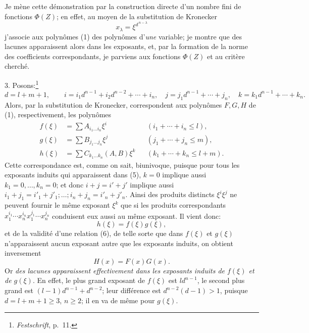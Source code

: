 \documentclass[11pt]{article}
\begin{document}
Je mène cette démonstration par la construction directe d'un nombre fini de fonctions $\Phi(Z)$; en effet, au moyen de la substitution de Kronecker
\[
 x_\lambda=\xi^{d^{\,n-\lambda}}
\]
j'associe aux polynômes (1) des polynômes d'\emph{une} variable; je montre que des lacunes apparaissent alors dans les exposants, et, par la formation de la norme des coefficients correspondants, je parviens aux fonctions $\Phi(Z)$ et au critère cherché.

3. Posons:\footnote{\emph{Festschrift}, p.~11.}
\begin{equation}
 d=l+m+1,\qquad
 i=i_1d^{n-1}+i_2d^{n-2}+\cdots+i_n,
\quad
 j=j_1d^{n-1}+\cdots+j_n,
\quad
 k=k_1d^{n-1}+\cdots+k_n.
\tag{4}
\end{equation}
Alors, par la substitution de Kronecker, correspondent aux polynômes $F,G,H$ de (1), respectivement, les polynômes
\begin{equation}
\begin{aligned}
 f(\xi)&=\sum A_{i_1\ldots i_n}\xi^i &&(i_1+\cdots+i_n\le l),\\
 g(\xi)&=\sum B_{j_1\ldots j_n}\xi^j &&(j_1+\cdots+j_n\le m),\\
 h(\xi)&=\sum C_{k_1\ldots k_n}(A,B)\xi^k &&(k_1+\cdots+k_n\le l+m).
\end{aligned}
\tag{5}
\end{equation}
Cette correspondance est, comme on sait, biunivoque, puisque pour tous les exposants induits qui apparaissent dans (5), $k=0$ implique aussi $k_1=0,\ldots,k_n=0$; et donc $i+j=i'+j'$ implique aussi $i_1+j_1=i'_1+j'_1;\ldots;i_n+j_n=i'_n+j'_n$. Ainsi des produits distincts $\xi^i\xi^j$ ne peuvent fournir le même exposant $\xi^k$ que si les produits correspondants $x_1^{i_1}\cdots x_n^{i_n}x_1^{j_1}\cdots x_n^{j_n}$ conduisent eux aussi au même exposant. Il vient donc:
\begin{equation}
 h(\xi)=f(\xi)g(\xi),
\tag{6}
\end{equation}
et de la validité d'une relation (6), de telle sorte que dans $f(\xi)$ et $g(\xi)$ n'apparaissent aucun exposant autre que les exposants induits, on obtient inversement
\begin{equation}
 H(x)=F(x)G(x).
\tag{7}
\end{equation}
Or \emph{des lacunes apparaissent effectivement dans les exposants induits de $f(\xi)$ et de $g(\xi)$}. En effet, le plus grand exposant de $f(\xi)$ est $ld^{n-1}$, le second plus grand est $(l-1)d^{n-1}+d^{n-2}$; leur différence est $d^{n-2}(d-1)>1$, puisque $d=l+m+1\ge3$, $n\ge2$; il en va de même pour $g(\xi)$.
\end{document}
